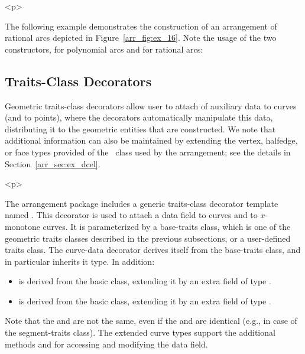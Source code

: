 \begin{ccHtmlOnly}<p>\end{ccHtmlOnly}
The following example demonstrates the construction of an
arrangement of rational arcs depicted in
Figure~\ref{arr_fig:ex_16}. Note the usage of the two
constructors, for polynomial arcs and for rational arcs:


\subsection{Traits-Class Decorators}
\label{arr_ssec:meta_tr}
%
Geometric traits-class decorators allow user to attach of auxiliary
data to curves (and to points), where the decorators automatically
manipulate this data, distributing it to the geometric entities that
are constructed. We note that additional information can also be maintained
by extending the vertex, halfedge, or face types provided of the
\dcel\ class used by the arrangement; see the details in
Section~\ref{arr_sec:ex_dcel}.

\begin{ccHtmlOnly}<p>\end{ccHtmlOnly}
The arrangement package includes a generic traits-class decorator
template named 
.
This decorator is used to attach a data field to curves and to
$x$-monotone curves. It is parameterized by a base-traits class, which is
one of the geometric traits classes described in the previous subsections, or
a user-defined traits class. The curve-data decorator derives itself from the
base-traits class, and in particular inherits it  type.
In addition:
\begin{itemize}
\item {} is derived from the basic 
class, extending it by an extra field of type .
%
\item {} is derived from the basic
 class, extending it by an extra field of
type .
\end{itemize}
Note that the  and  are not
the same, even if the  and
 are identical (e.g., in case
of the segment-traits class). The extended curve types support the
additional methods  and  for
accessing and modifying the data field.

